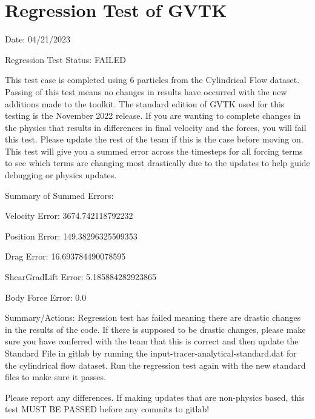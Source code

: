 \documentclass{article}
\begin{document}
\section{Regression Test of GVTK}
Date: 04/21/2023

\vspace{5pt}

\noindent Regression Test Status: FAILED

\vspace{5pt}

\noindent This test case is completed using 6 particles from the Cylindrical Flow dataset. Passing of this test means no changes in results have occurred with the new additions made to the toolkit.
The standard edition of GVTK used for this testing is the November 2022 release. If you are wanting to complete changes in the physics that results in differences in final velocity and the forces,
you will fail this test. Please update the rest of the team if this is the case before moving on. This test will give you a summed error across the timesteps for all forcing terms to see which terms
are changing most drastically due to the updates to help guide debugging or physics updates.



\vspace{5pt}

\noindent Summary of Summed Errors:
\vspace{5pt}

Velocity Error: 3674.742118792232

Position Error: 149.38296325509353

Drag Error: 16.693784490078595

ShearGradLift Error: 5.185884282923865

Body Force Error: 0.0

\vspace{5pt}

\noindent Summary/Actions: Regression test has failed meaning there are drastic changes in the results of the code. 
If there is supposed to be drastic changes, please make sure you have conferred with the team that this is correct and then update the Standard File in gitlab by running the input-tracer-analytical-standard.dat for the cylindrical flow dataset.
Run the regression test again with the new standard files to make sure it passes.

\vspace{5pt}

\noindent Please report any differences. If making updates that are non-physics based, this test MUST BE PASSED before any commits to gitlab!
\end{document}
